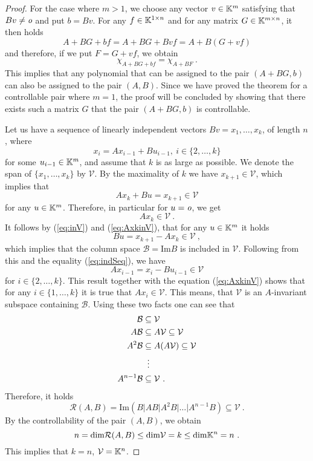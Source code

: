 \begin{proof}
    For the case where $m>1$, we choose any vector $v\in\mathbb{K}^m$ satisfying that $Bv\neq \textit{o}$ and put $b=Bv$. For any $f\in\mathbb{K}^{1\times n}$ and for any matrix $G\in\mathbb{K}^{m\times n}$, it then holds
    $${A+BG+bf}={A+BG+Bvf}={A+B(G+vf)}$$
    and therefore, if we put $F=G+vf$, we obtain 
    $$\chi_{A+BG+bf}=\chi_{A+BF}\ .$$
    This implies that any polynomial that can be assigned to the pair $(A+BG,b)$ can also be assigned to the pair $(A,B)$. Since we have proved the theorem for a controllable pair where $m=1$, the proof will be concluded by showing that there exists such a matrix $G$ that the pair $(A+BG,b)$ is controllable.
       
    Let us have a sequence of linearly independent vectors $Bv=x_1,\ldots,x_k$, of length $n$, where
    \begin{equation}
    \label{eq:indSeq}
        x_{i}=Ax_{i-1}+Bu_{i-1},\ i\in\{2,\ldots,k\}
    \end{equation}
    for some $u_{i-1}\in\mathbb{K}^m$, and assume that $k$ is as large as possible. We denote the span of $\{x_1,\ldots,x_k\}$ by $\mathcal{V}$. By the maximality of $k$ we have $x_{k+1}\in\mathcal{V}$, which implies that
    \begin{equation}
    \label{eq:inV}    
        Ax_k+Bu=x_{k+1}\in\mathcal{V}
    \end{equation}
    for any $u\in\mathbb{K}^m$. Therefore, in particular for $u=\textit{o}$, we get 
    \begin{equation}
    \label{eq:AxkinV}
        Ax_k\in\mathcal{V}\ .
    \end{equation}
    It follows by (\ref{eq:inV}) and (\ref{eq:AxkinV}), that for any $u\in\mathbb{K}^m$ it holds
    $$Bu=x_{k+1}-Ax_k\in\mathcal{V}\ ,$$
    which implies that the column space $\mathcal{B}=\text{Im}B$ is included in $\mathcal{V}$. Following from this and the equality (\ref{eq:indSeq}), we have 
    $$Ax_{i-1}=x_i-Bu_{i-1}\in\mathcal{V}$$
    for $i\in\{2,\ldots,k\}$. This result together with the equation (\ref{eq:AxkinV}) shows that for any $i\in\{1,\ldots,k\}$ it is true that $Ax_i\in\mathcal{V}$. This means, that $\mathcal{V}$ is an $A$-invariant subspace containing $\mathcal{B}$. Using these two facts one can see that 
    \begin{align*}
        \mathcal{B}&\subseteq\mathcal{V} \\
        A\mathcal{B}&\subseteq A\mathcal{V}\subseteq\mathcal{V} \\
        A^2\mathcal{B}&\subseteq A(A\mathcal{V})\subseteq\mathcal{V} \\
        &\vdotswithin{\subseteq} \\
        A^{n-1}\mathcal{B}&\subseteq\mathcal{V}
        \ .
    \end{align*}
    Therefore, it holds
    $$\mathcal{R}(A,B)=\text{Im}(B|AB|A^2B|\ldots|A^{n-1}B)\subseteq\mathcal{V}\ .$$
    By the controllability of the pair $(A,B)$, we obtain
    $$n=\text{dim}\mathcal{R}(A,B)\leq\text{dim}\mathcal{V}=k\leq\text{dim}\K^n=n\ .$$
    This implies that $k=n$, $\mathcal{V}=\mathbb{K}^n$.


\end{proof}
